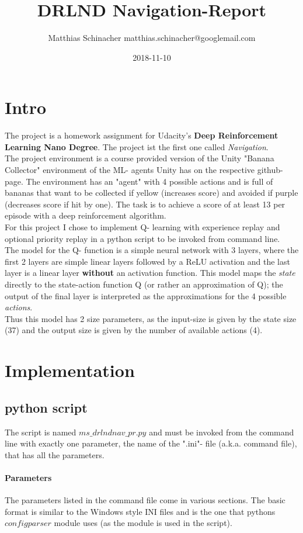 \documentclass{article}
\title{DRLND Navigation-Report}
\date{2018-11-10}
\author{Matthias Schinacher matthias.schinacher@googlemail.com}
\begin{document}
\maketitle
\tableofcontents
\newpage

\section{Intro}
The project is a homework assignment for Udacity's \textbf{Deep Reinforcement Learning Nano Degree}.
The project ist the first one called \textit{Navigation}.
\\
The project environment is a course provided version of the Unity "Banana Collector"
environment of the ML- agents Unity has on the respective github- page.
The environment has an "agent" with 4 possible actions and is full of bananas
that want to be collected if yellow (increases score) and avoided if purple
(decreases score if hit by one). The task is to achieve a score of at least 13
per episode with a deep reinforcement algorithm.
\\
For this project I chose to implement Q- learning with experience replay and
optional priority replay in a python script to be invoked from command line.
\\
The model for the Q- function is a simple neural network with 3 layers,
where the first 2 layers are simple linear layers followed by a ReLU activation
and the last layer is a linear layer \textbf{without} an activation function.
This model maps the \textit{state} directly to the state-action function Q
(or rather an approximation of Q); the output of the final layer is interpreted
as the approximations for the 4 possible \textit{actions}.
\\
Thus this model has 2 size parameters, as the input-size is given by the state size (37)
and the output size is given by the number of available actions (4).

\section{Implementation}
\subsection{python script}
The script is named $ms\_drlndnav\_pr.py$ and must be invoked from the command
line with exactly one parameter, the name of the ".ini"- file (a.k.a. command file),
that has all the parameters.

\paragraph{Parameters}
The parameters listed in the command file come in various sections. The basic format
is similar to the Windows style INI files and is the one that pythons $configparser$
module uses (as the module is used in the script).
\end{document}

